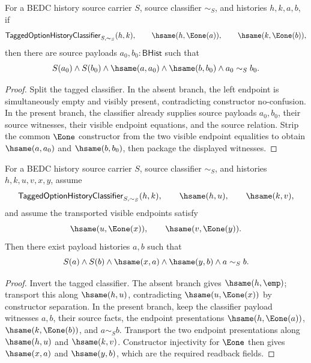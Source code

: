 \begin{theorem}
\label{thm:tagged-option-history-classifier-visible-endpoint-pair-readback}
For a BEDC history source carrier $S$, source classifier $\sim_S$, and
histories $h,k,a,b$, if
$$
\mathsf{TaggedOptionHistoryClassifier}_{S,\sim_S}(h,k),
\qquad
\hsame(h,\Eone(a)),
\qquad
\hsame(k,\Eone(b)),
$$
then there are source payloads $a_0,b_0:\mathsf{BHist}$ such that
$$
S(a_0)\land S(b_0)\land \hsame(a,a_0)\land \hsame(b,b_0)\land a_0\sim_S b_0.
$$
\end{theorem}
\begin{proof}
Split the tagged classifier. In the absent branch, the left endpoint is
simultaneously empty and visibly present, contradicting constructor
no-confusion. In the present branch, the classifier already supplies source
payloads $a_0,b_0$, their source witnesses, their visible endpoint equations,
and the source relation. Strip the common $\Eone$ constructor from the two
visible endpoint equalities to obtain $\hsame(a,a_0)$ and $\hsame(b,b_0)$, then
package the displayed witnesses.
\end{proof}

\begin{theorem}
\label{thm:tagged-option-history-classifier-transport-visible-payload-readback}
For a BEDC history source carrier \(S\), source classifier \(\sim_S\), and
histories \(h,k,u,v,x,y\), assume
$$
\mathsf{TaggedOptionHistoryClassifier}_{S,\sim_S}(h,k),
\qquad
\hsame(h,u),
\qquad
\hsame(k,v),
$$
and assume the transported visible endpoints satisfy
$$
\hsame(u,\Eone(x)),
\qquad
\hsame(v,\Eone(y)).
$$
Then there exist payload histories \(a,b\) such that
$$
S(a)\land S(b)\land \hsame(x,a)\land \hsame(y,b)\land a\sim_S b.
$$
\end{theorem}
\begin{proof}
Invert the tagged classifier. The absent branch gives
\(\hsame(h,\emp)\); transport this along \(\hsame(h,u)\), contradicting
\(\hsame(u,\Eone(x))\) by constructor separation. In the present branch, keep
the classifier payload witnesses \(a,b\), their source facts, the endpoint
presentations \(\hsame(h,\Eone(a))\), \(\hsame(k,\Eone(b))\), and \(a\sim_S b\).
Transport the two endpoint presentations along \(\hsame(h,u)\) and
\(\hsame(k,v)\). Constructor injectivity for \(\Eone\) then gives
\(\hsame(x,a)\) and \(\hsame(y,b)\), which are the required readback fields.
\end{proof}
